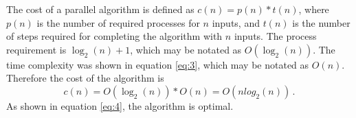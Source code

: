 \documentclass[pdftex, 11pt, a4paper, titlepage]{article}
\begin{document}
        The cost of a parallel algorithm is defined as $c(n) = p(n) * t(n)$, where $p(n)$ is the number of required processes for $n$
        inputs, and $t(n)$ is the number of steps required for completing the algorithm with $n$ inputs. The process requirement is
        $\log_{2}(n)+1$, which may be notated as $O(\log_{2}(n))$. The time complexity was shown in equation \ref{eq:3},
        which may be notated as $O(n)$. Therefore the cost of the algorithm is
        \begin{equation}\label{eq:4}
            c(n) = O(\log_{2}(n)) * O(n) = O(nlog_{2}(n))\,.
        \end{equation}
        As shown in equation \ref{eq:4}, the algorithm is optimal.
\end{document}
